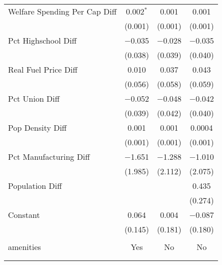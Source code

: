 \begin{table}[!htbp]
\begin{tabular}{@{\extracolsep{5pt}}lccc}
  Welfare Spending Per Cap Diff & 0.002$^{*}$ & 0.001 & 0.001 \\ 
  & (0.001) & (0.001) & (0.001) \\ 
  Pct Highschool Diff & $-$0.035 & $-$0.028 & $-$0.035 \\ 
  & (0.038) & (0.039) & (0.040) \\ 
  Real Fuel Price Diff & 0.010 & 0.037 & 0.043 \\ 
  & (0.056) & (0.058) & (0.059) \\ 
  Pct Union Diff & $-$0.052 & $-$0.048 & $-$0.042 \\ 
  & (0.039) & (0.042) & (0.040) \\ 
  Pop Density Diff & 0.001 & 0.001 & 0.0004 \\ 
  & (0.001) & (0.001) & (0.001) \\ 
  Pct Manufacturing Diff & $-$1.651 & $-$1.288 & $-$1.010 \\ 
  & (1.985) & (2.112) & (2.075) \\ 
  Population Diff &  &  & 0.435 \\ 
  &  &  & (0.274) \\ 
  Constant & 0.064 & 0.004 & $-$0.087 \\ 
  & (0.145) & (0.181) & (0.180) \\ 
 \hline \\[-1.8ex] 
amenities & Yes & No & No \\ 
\hline \\[-1.8ex] 
\hline 
\hline \\[-1.8ex] 
\end{tabular} 
\end{table} 
